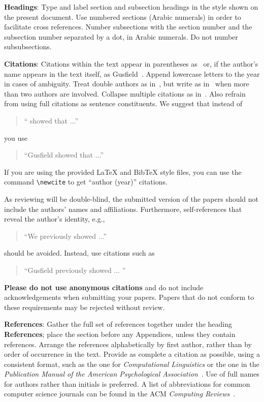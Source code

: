 \documentclass[11pt]{article}
\begin{document}
{\bf Headings}: Type and label section and subsection headings in the
style shown on the present document.  Use numbered sections (Arabic
numerals) in order to facilitate cross references. Number subsections
with the section number and the subsection number separated by a dot,
in Arabic numerals. Do not number subsubsections.

{\bf Citations}: Citations within the text appear
in parentheses as~\cite{Gusfield:97} or, if the author's name appears in
the text itself, as Gusfield~. 
Append lowercase letters to the year in cases of ambiguity.  
Treat double authors as in~\cite{Aho:72}, but write as in~\cite{Chandra:81} when more than two authors are involved. Collapse multiple citations as in~\cite{Gusfield:97,Aho:72}. Also refrain from using full citations as sentence constituents. We suggest that instead of
\begin{quote}
  ``\cite{Gusfield:97} showed that ...''
\end{quote}
you use
\begin{quote}
``Gusfield    showed that ...''
\end{quote}

If you are using the provided \LaTeX{} and Bib\TeX{} style files, you
can use the command \verb|\newcite| to get ``author (year)'' citations.

As reviewing will be double-blind, the submitted version of the papers should not include the
authors' names and affiliations. Furthermore, self-references that
reveal the author's identity, e.g.,
\begin{quote}
``We previously showed \cite{Gusfield:97} ...''  
\end{quote}
should be avoided. Instead, use citations such as 
\begin{quote}
``Gusfield 
previously showed ... ''
\end{quote}

\textbf{Please do not  use anonymous citations} and  do not include acknowledgements when submitting your papers. Papers that do not conform
to these requirements may be rejected without review. 

\textbf{References}: Gather the full set of references together under
the heading {\bf References}; place the section before any Appendices,
unless they contain references. Arrange the references alphabetically
by first author, rather than by order of occurrence in the text.
Provide as complete a citation as possible, using a consistent format,
such as the one for {\em Computational Linguistics\/} or the one in the 
{\em Publication Manual of the American 
Psychological Association\/}~\cite{APA:83}.  Use of full names for
authors rather than initials is preferred.  A list of abbreviations
for common computer science journals can be found in the ACM 
{\em Computing Reviews\/}~\cite{ACM:83}.
\end{document}
